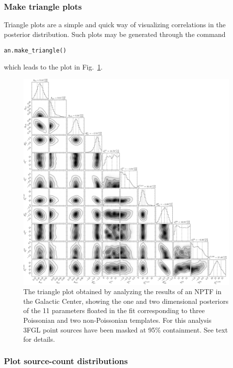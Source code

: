 \subsubsection{Make triangle plots}

Triangle plots are a simple and quick way of visualizing correlations in the posterior distribution.  Such plots may be generated through the command
\begin{lstlisting}
an.make_triangle()
\end{lstlisting}
which leads to the plot in Fig.~\ref{fig:gc_triangle}.

\begin{figure}[htb]
\leavevmode
\begin{center}
\includegraphics[width=.98\textwidth]{ch-nptfit/gce_triangle.pdf}
\end{center}
\vspace{-.50cm}
\caption{The triangle plot obtained by analyzing the results of an NPTF in the Galactic Center, showing the one and two dimensional posteriors of the 11 parameters floated in the fit corresponding to three Poissonian and two non-Poissonian templates. For this analysis 3FGL point sources have been masked at 95\% containment. See text for details.}
\label{fig:gc_triangle}
\end{figure}

\subsubsection{Plot source-count distributions}

